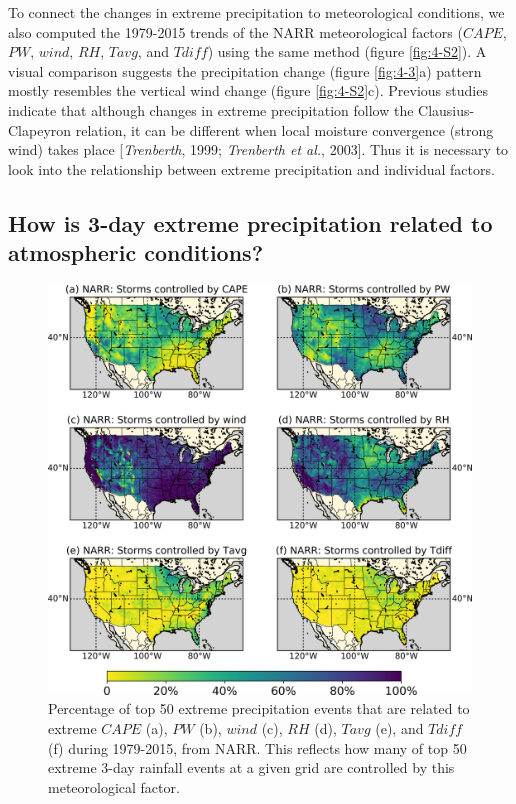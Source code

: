 To connect the changes in extreme precipitation to meteorological conditions, we also computed the 1979-2015 trends of the NARR meteorological factors ($CAPE$, $PW$, $wind$, $RH$, $Tavg$, and $Tdiff$) using the same method (figure \ref{fig:4-S2}). A visual comparison suggests the precipitation change (figure \ref{fig:4-3}a) pattern mostly resembles the vertical wind change (figure \ref{fig:4-S2}c). Previous studies indicate that although changes in extreme precipitation follow the Clausius-Clapeyron relation, it can be different when local moisture convergence (strong wind) takes place [\textit{Trenberth}, 1999; \textit{Trenberth et al.}, 2003]. Thus it is necessary to look into the relationship between extreme precipitation and individual factors.

\subsection{How is 3-day extreme precipitation related to atmospheric conditions?}

\begin{figure}[htbp]
	\includegraphics[width=\linewidth]{pics/ch4/fig4.png}
	\caption{Percentage of top 50 extreme precipitation events that are related to extreme $CAPE$ (a), $PW$ (b), $wind$ (c), $RH$ (d), $Tavg$ (e), and $Tdiff$ (f) during 1979-2015, from NARR. This reflects how many of top 50 extreme 3-day rainfall events at a given grid are controlled by this meteorological factor.}
	\label{fig:4-4}
\end{figure}

